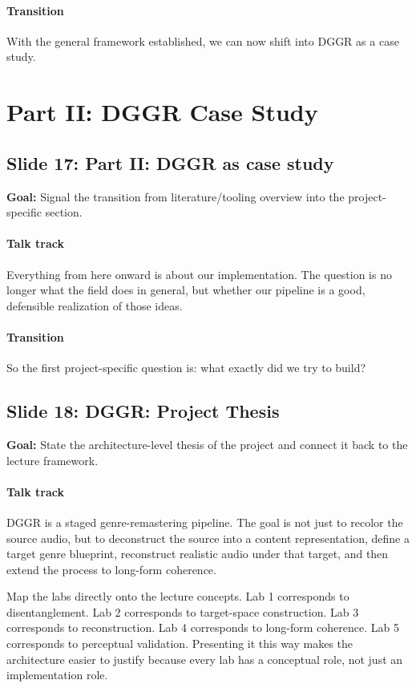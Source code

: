 \documentclass[11pt]{article}
\begin{document}
\paragraph{Transition}
With the general framework established, we can now shift into DGGR as a case study.

\newpage
\section{Part II: DGGR Case Study}
\subsection*{Slide 17: Part II: DGGR as case study}
\textbf{Goal:} Signal the transition from literature/tooling overview into the project-specific section.
\paragraph{Talk track}
Everything from here onward is about our implementation. The question is no longer what the field does in general, but whether our pipeline is a good, defensible realization of those ideas.

\paragraph{Transition}
So the first project-specific question is: what exactly did we try to build?

\subsection*{Slide 18: DGGR: Project Thesis}
\textbf{Goal:} State the architecture-level thesis of the project and connect it back to the lecture framework.
\paragraph{Talk track}
DGGR is a staged genre-remastering pipeline. The goal is not just to recolor the source audio, but to deconstruct the source into a content representation, define a target genre blueprint, reconstruct realistic audio under that target, and then extend the process to long-form coherence.

Map the labs directly onto the lecture concepts. Lab 1 corresponds to disentanglement. Lab 2 corresponds to target-space construction. Lab 3 corresponds to reconstruction. Lab 4 corresponds to long-form coherence. Lab 5 corresponds to perceptual validation. Presenting it this way makes the architecture easier to justify because every lab has a conceptual role, not just an implementation role.
\end{document}
